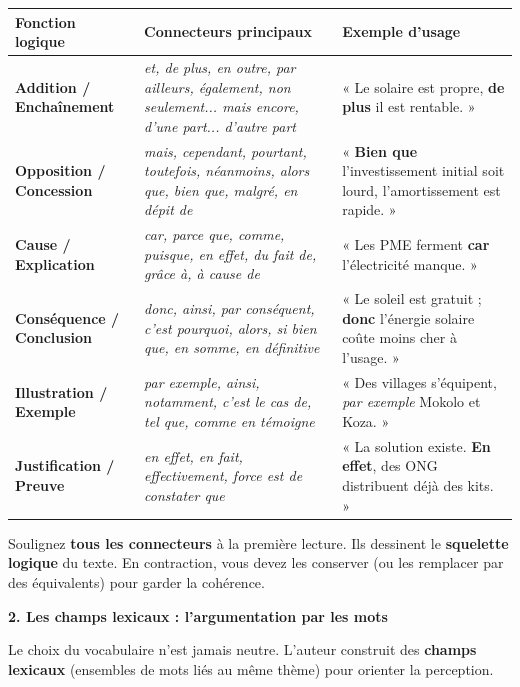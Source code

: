 \documentclass[11pt]{article}
\begin{document}
\begin{center}
\begin{tabularx}{\linewidth}{|l|X|X|}\hline
\rowcolor{popblueL}
\textbf{Fonction logique} & \textbf{Connecteurs principaux} & \textbf{Exemple d'usage} \\ \hline
\textbf{Addition / Enchaînement} & \emph{et, de plus, en outre, par ailleurs, également, non seulement... mais encore, d'une part... d'autre part} & « Le solaire est propre, \textbf{de plus} il est rentable. » \\ \hline
\textbf{Opposition / Concession} & \emph{mais, cependant, pourtant, toutefois, néanmoins, alors que, bien que, malgré, en dépit de} & « \textbf{Bien que} l'investissement initial soit lourd, l'amortissement est rapide. » \\ \hline
\textbf{Cause / Explication} & \emph{car, parce que, comme, puisque, en effet, du fait de, grâce à, à cause de} & « Les PME ferment \textbf{car} l'électricité manque. » \\ \hline
\textbf{Conséquence / Conclusion} & \emph{donc, ainsi, par conséquent, c'est pourquoi, alors, si bien que, en somme, en définitive} & « Le soleil est gratuit ; \textbf{donc} l'énergie solaire coûte moins cher à l'usage. » \\ \hline
\textbf{Illustration / Exemple} & \emph{par exemple, ainsi, notamment, c'est le cas de, tel que, comme en témoigne} & « Des villages s'équipent, \emph{par exemple} Mokolo et Koza. » \\ \hline
\textbf{Justification / Preuve} & \emph{en effet, en fait, effectivement, force est de constater que} & « La solution existe. \textbf{En effet}, des ONG distribuent déjà des kits. » \\ \hline
\end{tabularx}
\end{center}

\begin{aretenir}
Soulignez \textbf{tous les connecteurs} à la première lecture. Ils dessinent le \textbf{squelette logique} du texte. En contraction, vous devez les conserver (ou les remplacer par des équivalents) pour garder la cohérence.
\end{aretenir}

\textbf{2. Les champs lexicaux : l'argumentation par les mots}\par

Le choix du vocabulaire n'est jamais neutre. L'auteur construit des \textbf{champs lexicaux} (ensembles de mots liés au même thème) pour orienter la perception.
\end{document}
